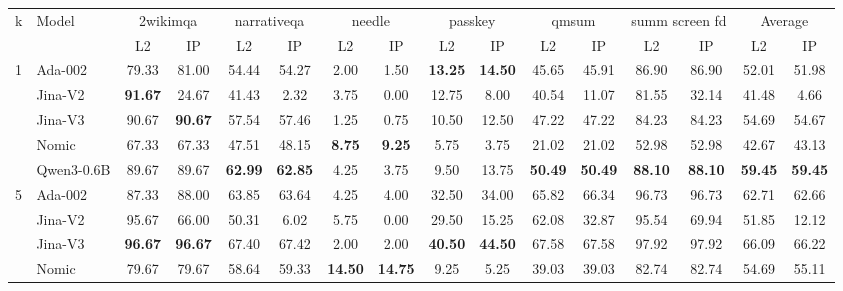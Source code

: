\begin{sidewaystable}[htbp!]
\centering
\footnotesize
{}
\label{tab:detailed_recall}
\begin{tabular}{llcccccccccccccc}
\toprule
\multirow{2}{*}{k} & \multirow{2}{*}{Model} & \multicolumn{2}{c}{2wikimqa} & \multicolumn{2}{c}{narrativeqa} & \multicolumn{2}{c}{needle} & \multicolumn{2}{c}{passkey} & \multicolumn{2}{c}{qmsum} & \multicolumn{2}{c}{summ screen fd} & \multicolumn{2}{c}{Average} \\
\cmidrule(lr){3-4} \cmidrule(lr){5-6} \cmidrule(lr){7-8} \cmidrule(lr){9-10} \cmidrule(lr){11-12} \cmidrule(lr){13-14} \cmidrule(lr){15-16}
& & L2 & IP & L2 & IP & L2 & IP & L2 & IP & L2 & IP & L2 & IP & L2 & IP \\
\midrule
\multirow{5}{*}{1} & Ada-002 & 79.33 & 81.00 & 54.44 & 54.27 & 2.00 & 1.50 & \textbf{13.25} & \textbf{14.50} & 45.65 & 45.91 & 86.90 & 86.90 & 52.01 & 51.98 \\
& Jina-V2 & \textbf{91.67} & 24.67 & 41.43 & 2.32 & 3.75 & 0.00 & 12.75 & 8.00 & 40.54 & 11.07 & 81.55 & 32.14 & 41.48 & 4.66 \\
& Jina-V3 & 90.67 & \textbf{90.67} & 57.54 & 57.46 & 1.25 & 0.75 & 10.50 & 12.50 & 47.22 & 47.22 & 84.23 & 84.23 & 54.69 & 54.67 \\
& Nomic & 67.33 & 67.33 & 47.51 & 48.15 & \textbf{8.75} & \textbf{9.25} & 5.75 & 3.75 & 21.02 & 21.02 & 52.98 & 52.98 & 42.67 & 43.13 \\
& Qwen3-0.6B & 89.67 & 89.67 & \textbf{62.99} & \textbf{62.85} & 4.25 & 3.75 & 9.50 & 13.75 & \textbf{50.49} & \textbf{50.49} & \textbf{88.10} & \textbf{88.10} & \textbf{59.45} & \textbf{59.45} \\
\midrule
\multirow{5}{*}{5} & Ada-002 & 87.33 & 88.00 & 63.85 & 63.64 & 4.25 & 4.00 & 32.50 & 34.00 & 65.82 & 66.34 & 96.73 & 96.73 & 62.71 & 62.66 \\
& Jina-V2 & 95.67 & 66.00 & 50.31 & 6.02 & 5.75 & 0.00 & 29.50 & 15.25 & 62.08 & 32.87 & 95.54 & 69.94 & 51.85 & 12.12 \\
& Jina-V3 & \textbf{96.67} & \textbf{96.67} & 67.40 & 67.42 & 2.00 & 2.00 & \textbf{40.50} & \textbf{44.50} & 67.58 & 67.58 & 97.92 & 97.92 & 66.09 & 66.22 \\
& Nomic & 79.67 & 79.67 & 58.64 & 59.33 & \textbf{14.50} & \textbf{14.75} & 9.25 & 5.25 & 39.03 & 39.03 & 82.74 & 82.74 & 54.69 & 55.11 \\

\end{tabular}
\end{sidewaystable}

